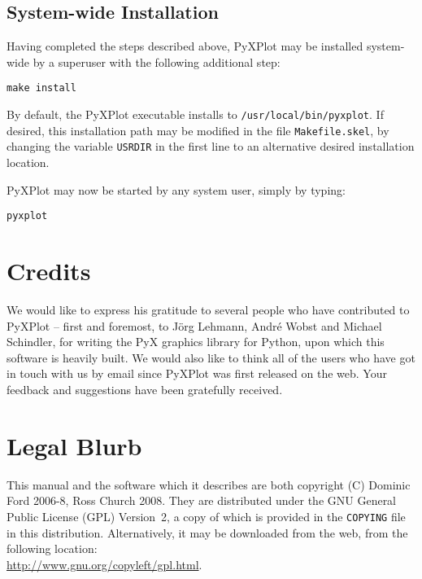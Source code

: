 \subsection{System-wide Installation}

Having completed the steps described above, PyXPlot may be installed
system-wide by a superuser with the following additional step:

\begin{verbatim}
make install
\end{verbatim}

By default, the PyXPlot executable installs to \texttt{/usr/local/bin/pyxplot}.
If desired, this installation path may be modified in the file
\texttt{Makefile.skel}, by changing the variable \texttt{USRDIR} in the first
line to an alternative desired installation location.

PyXPlot may now be started by any system user, simply by typing:

\begin{verbatim}
pyxplot
\end{verbatim}

\section{Credits}

We would like to express his gratitude to several people who have contributed
to PyXPlot -- first and foremost, to J\"org Lehmann, Andr\'e Wobst and Michael
Schindler, for writing the PyX graphics library for Python, upon which this
software is heavily built. We would also like to think all of the users who
have got in touch with us by email since PyXPlot was first released on the web.
Your feedback and suggestions have been gratefully received.

\section{Legal Blurb}

This manual and the software which it describes are both copyright (C) Dominic
Ford 2006-8, Ross Church 2008. They are distributed under the GNU General
Public License (GPL) Version~2, a copy of which is provided in the
\texttt{COPYING} file in this distribution.
Alternatively, it may be downloaded from the web, from the following
location:\\ \url{http://www.gnu.org/copyleft/gpl.html}.


